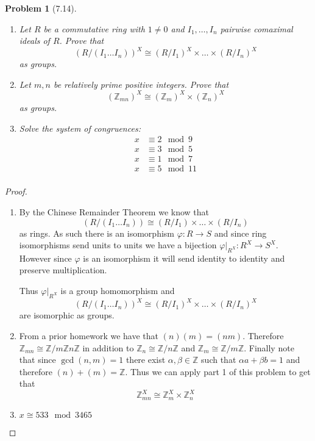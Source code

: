 \documentclass[10pt]{article}
\newcommand{\bb}[1]{\mathbb{#1}}
\theoremstyle{plain}
\newtheorem{problem}{Problem}
\theoremstyle{remark}
\begin{document}
\begin{problem}[7.14]
  \begin{enumerate}
  \item Let $R$ be a commutative ring with $1\neq 0$ and $I_1,\ldots,I_n$
    pairwise comaximal ideals of $R$. Prove that
    \[ (R/(I_1\ldots I_n))^X\cong (R/I_1)^X\times\ldots\times(R/I_n)^X \]
    as groups.
  \item Let $m,n$ be relatively prime positive integers. Prove that
    \[ (\bb{Z}_{mn})^X\cong (\bb{Z}_m)^X\times(\bb{Z}_n)^X \]
    as groups.
  \item Solve the system of congruences:
    \begin{align*}
      x &\equiv 2 \mod 9\\
      x &\equiv 3 \mod 5\\
      x &\equiv 1 \mod 7\\
      x &\equiv 5 \mod 11\\
    \end{align*}
  \end{enumerate}
\end{problem}

\begin{proof}
  \begin{enumerate}
  \item By the Chinese Remainder Theorem we know that
    \[(R/(I_1\ldots I_n))\cong (R/I_1)\times\ldots\times(R/I_n) \]
    as rings. As such there is an isomorphism
    $\varphi:R\rightarrow S$ and since ring isomorphisms send units to units we have
    a bijection $\varphi|_{R^X}:R^X\rightarrow S^X$. However since $\varphi$ is an isomorphism
    it will send identity to identity and preserve multiplication.

    Thus $\varphi|_{R^X}$ is a group homomorphism and
    \[ (R/(I_1\ldots I_n))^X\cong (R/I_1)^X\times\ldots\times(R/I_n)^X \]
    are isomorphic as groups.
    
  \item From a prior homework we have that $(n)(m)=(nm)$. Therefore
    $\bb{Z}_{mn}\cong \bb{Z}/m\bb{Z}n\bb{Z}$ in addition to
    $\bb{Z}_n\cong\bb{Z}/n\bb{Z}$ and $\bb{Z}_m\cong \bb{Z}/m\bb{Z}$.
    Finally note that since $\gcd(n,m)=1$ there exist $\alpha,\beta\in\bb{Z}$
    such that $\alpha a+\beta b = 1$ and therefore $(n)+(m)=\bb{Z}$. Thus
    we can apply part 1 of this problem to get that
    \[ \bb{Z}_{mn}^X\cong\bb{Z}_m^X\times\bb{Z}_n^X \]
  \item $x\cong 533 \mod 3465$
  \end{enumerate}
\end{proof}
\end{document}

